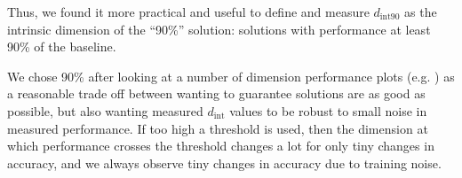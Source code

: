 \documentclass{article} %
\newcommand{\dint}{d_{\mathrm{int}}}
\newcommand{\dintn}{d_{\mathrm{int90}}}
\begin{document}





Thus, we found it more practical and useful to define and measure $\dintn$ as the intrinsic dimension of the ``90\%'' solution: solutions with performance at least 90\% of the baseline.
%

We chose 90\% after looking at a number of dimension \vs performance plots (e.g. ) as a reasonable trade off between wanting to guarantee solutions are as good as possible, but also wanting measured $\dint$ values to be robust to small noise in measured performance. If too high a threshold is used, then the dimension at which performance crosses the threshold changes a lot for only tiny changes in accuracy, and we always observe tiny changes in accuracy due to training noise.
\end{document}

